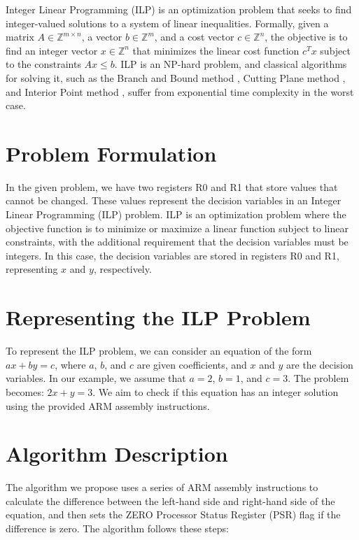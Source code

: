 Integer Linear Programming (ILP) is an optimization problem that seeks to find integer-valued solutions to a system of linear inequalities. Formally, given a matrix $A \in \mathbb{Z}^{m \times n}$, a vector $b \in \mathbb{Z}^{m}$, and a cost vector $c \in \mathbb{Z}^{n}$, the objective is to find an integer vector $x \in \mathbb{Z}^{n}$ that minimizes the linear cost function $c^T x$ subject to the constraints $Ax \leq b$. ILP is an NP-hard problem, and classical algorithms for solving it, such as the Branch and Bound method \cite{branch_and_bound}, Cutting Plane method \cite{cutting_planes}, and Interior Point method \cite{interior_point}, suffer from exponential time complexity in the worst case.

\section{Problem Formulation}

In the given problem, we have two registers R0 and R1 that store values that cannot be changed. These values represent the decision variables in an Integer Linear Programming (ILP) problem. ILP is an optimization problem where the objective function is to minimize or maximize a linear function subject to linear constraints, with the additional requirement that the decision variables must be integers. In this case, the decision variables are stored in registers R0 and R1, representing $x$ and $y$, respectively.

\section{Representing the ILP Problem}

To represent the ILP problem, we can consider an equation of the form $ax + by = c$, where $a$, $b$, and $c$ are given coefficients, and $x$ and $y$ are the decision variables. In our example, we assume that $a = 2$, $b = 1$, and $c = 3$. The problem becomes: $2x + y = 3$. We aim to check if this equation has an integer solution using the provided ARM assembly instructions.

\section{Algorithm Description}

The algorithm we propose uses a series of ARM assembly instructions to calculate the difference between the left-hand side and right-hand side of the equation, and then sets the ZERO Processor Status Register (PSR) flag if the difference is zero. The algorithm follows these steps:

